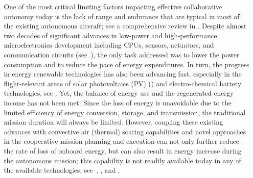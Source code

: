 \documentclass{ifacconf}
\begin{document}
One of the most critical limiting factors impacting effective collaborative
autonomy today is the lack of range and endurance that are typical in most of
the existing autonomous aircraft; see a comprehensive review in
\cite{NAC:2005}.
%
%
Despite almost two decades of significant advances in low-power and
high-performance microelectronics development including CPUs, sensors,
actuators, and communication circuits (see~\cite{Singh:2010}), the only task
addressed was to lower the power consumption and to reduce the pace of energy
expenditures. In turn, the progress in energy renewable technologies has also
been advancing fast, especially in the flight-relevant areas of solar
photovoltaics (PV) (\cite{Hamakawa:2004}) and electro-chemical battery
technologies, see \cite{Tarascon:2001}. Yet, the balance of energy use and
the regenerated energy income has not been met. Since the loss of energy is
unavoidable due to the limited efficiency of energy conversion, storage, and
transmission, the traditional mission duration will always be limited.
However, coupling these existing advances with convective air (thermal)
soaring capabilities and novel approaches in the cooperative mission planning
and execution can not only further reduce the rate of loss of onboard energy,
but can also result in energy increase during the autonomous mission; this
capability is not readily available today in any of the available
technologies, see~\cite{Siciliano:2008}, \cite{Martinez:2008}, and
\cite{Nonami:2013}.
\end{document}

